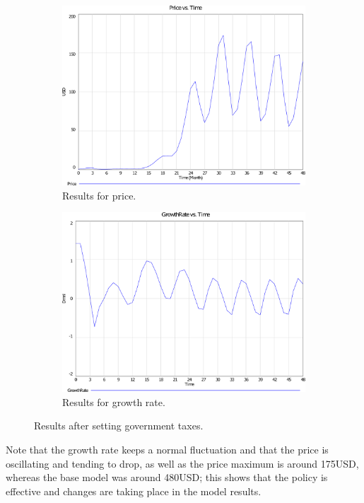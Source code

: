    \begin{figure}[H]
      \centering
      \begin{subfigure}[t]{0.4\textwidth}
        \includegraphics[scale = 0.3]{files/politTaxesPrice.pdf}
        \centering
        \caption{Results for price.}
      \end{subfigure}
      \hspace{1cm}
      \begin{subfigure}[t]{0.4\textwidth}
        \includegraphics[scale = 0.3]{files/politTaxesGrowth.pdf}
        \centering
        \caption{Results for growth rate.}
      \end{subfigure}
      \caption{Results after setting government taxes.}
      \label{img:polittaxes}
	\end{figure}
   Note that the growth rate keeps a normal fluctuation and that the price is oscillating and tending to drop, as well as the price maximum is around 175USD, whereas the base model was around 480USD; this shows that the policy is effective and changes are taking place in the model results.
   
